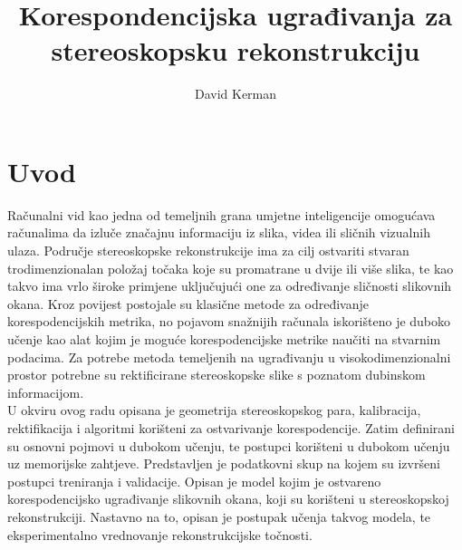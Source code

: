 \documentclass[times, utf8, zavrsni, numeric]{fer}
\begin{document}

\title{Korespondencijska ugrađivanja za stereoskopsku rekonstrukciju}

\author{David Kerman}

\maketitle




\tableofcontents

\chapter{Uvod}
Računalni vid kao jedna od temeljnih grana umjetne inteligencije omogućava računalima da izluče značajnu informaciju iz slika, videa ili sličnih vizualnih ulaza. Područje stereoskopske rekonstrukcije ima za cilj ostvariti stvaran trodimenzionalan položaj točaka koje su promatrane u dvije ili više slika, te kao takvo ima vrlo široke primjene uključujući one za određivanje sličnosti slikovnih okana. Kroz povijest postojale su klasične metode za određivanje korespodencijskih metrika, no pojavom snažnijih računala iskorišteno je duboko učenje kao alat kojim je moguće korespodencijske metrike naučiti na stvarnim podacima. Za potrebe metoda temeljenih na ugrađivanju u visokodimenzionalni prostor potrebne su rektificirane stereoskopske slike s poznatom dubinskom informacijom.\\

U okviru ovog radu opisana je geometrija stereoskopskog para, kalibracija, rektifikacija i algoritmi korišteni za ostvarivanje korespodencije. Zatim definirani su osnovni pojmovi u dubokom učenju, te postupci korišteni u dubokom učenju uz memorijske zahtjeve. Predstavljen je podatkovni skup na kojem su izvršeni postupci treniranja i validacije. Opisan je model kojim je ostvareno korespodencijsko ugrađivanje slikovnih okana, koji su korišteni u stereoskopskoj rekonstrukciji. Nastavno na to, opisan je postupak učenja takvog modela, te eksperimentalno vrednovanje rekonstrukcijske točnosti.
\end{document}
